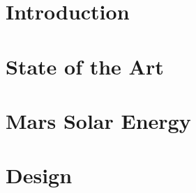 \documentclass[%
    draft, %
    11pt,
    a4paper
]
{memoir}
\begin{document}

\chapter{Introduction}
\label{sec:Introduction}


\chapter{State of the Art}
\label{sec:StateOfTheArt}



\chapter{Mars Solar Energy}
\label{sec:MarsSolarEnergy}



\chapter{Design}
\label{sec:Design}


%
\end{document}
